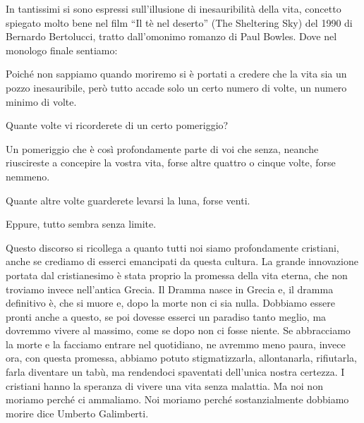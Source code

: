 \documentclass[12pt]{book} %
\begin{document}
\bigskip

In tantissimi si sono espressi sull'illusione di inesauribilità della vita, concetto spiegato molto
bene nel film “Il tè nel deserto” (The Sheltering Sky) del 1990 di Bernardo Bertolucci, tratto dall'omonimo romanzo di
Paul Bowles. Dove nel monologo finale sentiamo:

Poiché non sappiamo quando moriremo si è portati a credere che la vita sia un pozzo inesauribile, però tutto accade solo
un certo numero di volte, un numero minimo di volte.

Quante volte vi ricorderete di un certo pomeriggio?

Un pomeriggio che è così profondamente parte di voi che senza, neanche riuscireste a concepire la vostra vita, forse
altre quattro o cinque volte, forse nemmeno.

Quante altre volte guarderete levarsi la luna, forse venti.

Eppure, tutto sembra senza limite.


\bigskip

Questo discorso si ricollega a quanto tutti noi siamo profondamente cristiani, anche se crediamo di esserci emancipati
da questa cultura. La grande innovazione portata dal cristianesimo è stata proprio la promessa della vita eterna, che
non troviamo invece nell'antica Grecia. Il Dramma nasce in Grecia e, il dramma definitivo è, che
si muore e, dopo la morte non ci sia nulla. Dobbiamo essere pronti anche a questo, se poi dovesse esserci un paradiso
tanto meglio, ma dovremmo vivere al massimo, come se dopo non ci fosse niente. Se abbracciamo la morte e la facciamo
entrare nel quotidiano, ne avremmo meno paura, invece ora, con questa promessa, abbiamo potuto stigmatizzarla,
allontanarla, rifiutarla, farla diventare un tabù, ma rendendoci spaventati dell'unica nostra
certezza. I cristiani hanno la speranza di vivere una vita senza malattia. Ma noi non moriamo perché ci ammaliamo. Noi
moriamo perché sostanzialmente dobbiamo morire dice Umberto Galimberti.


\bigskip
\end{document}
